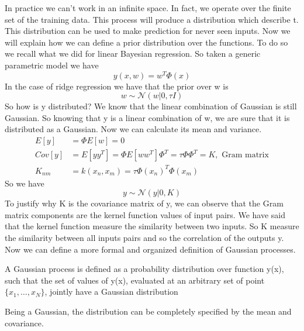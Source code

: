 \documentclass[main.tex]{subfiles}
\begin{document}
In practice we can't work in an infinite space. In fact, we operate over the finite set of the training data. This process will produce a distribution which describe t. This distribution can be used to make prediction for never seen inputs.
Now we will explain how we can define a prior distribution over the functions. To do so we recall what we did for linear Bayesian regression. So taken a generic parametric model we have
\begin{equation*}
    y(x,w)=w^T \Phi(x)
\end{equation*}
In the case of ridge regression we have that the prior over w is
\begin{equation*}
    w \sim \mathcal{N}(w|0, \tau I)
\end{equation*}
So how is y distributed?\footnotemark {} We know that the linear combination of Gaussian is still Gaussian. So knowing that y is a linear combination of w, we are sure that it is distributed as a Gaussian. Now we can calculate its mean and variance.
\begin{align*}
    E[y] &= \Phi E[w] = 0 \\
    Cov[y] &= E[yy^T] = \Phi E[ww^T] \Phi^T = \tau \Phi \Phi^T = K, \text{ Gram matrix}\\
    K_{nm} &= k(x_n, x_m) = \tau\Phi(x_n)^T\Phi(x_m)
\end{align*}
So we have
\begin{equation}
    y \sim \mathcal{N}(y|0, K)
\end{equation}
To justify why K is the covariance matrix of y, we can observe that the Gram matrix components are the kernel function values of input pairs. We have said that the kernel function measure the similarity between two inputs. So K measure the similarity between all inputs pairs and so the correlation of the outputs y.
Now we can define a more formal and organized definition of Gaussian processes.
\begin{definition}
A Gaussian process is defined as a probability distribution over function y(x), such that the set of values of y(x), evaluated at an arbitrary set of point $\{x_1, \dots, x_N\}$, jointly have a Gaussian distribution
\end{definition}
Being a Gaussian, the distribution can be completely specified by the mean and covariance.
\end{document}
